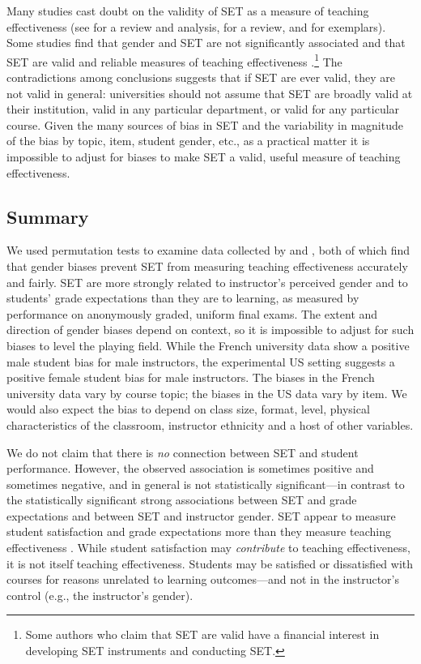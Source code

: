 \documentclass[12pt]{article}
\begin{document}
Many studies cast doubt on the validity of SET as a measure of teaching effectiveness 
(see \citet[Chapters 3--5]{johnson03} for a review and analysis, \citet{Pounder2007} for a review, 
and \citet{Galbraith2012,Carrell2010a} for exemplars). 
Some studies find that gender and SET are not significantly associated \citep{Bennett1982,Centra2000,Elmore1974} and that SET are valid and reliable measures of teaching effectiveness \citep{Benton2012,Centra1977}.\footnote{%
  Some authors who claim that SET are valid have a financial interest in 
  developing SET instruments and conducting SET.
} 
The contradictions among conclusions suggests that if SET are ever valid, they
are not valid in general: universities should not assume that SET are broadly valid at their
institution, valid in any particular department, or valid for any particular course. 
Given the many sources of bias in SET and the variability in magnitude of the bias
by topic, item, student gender, etc., as a practical matter it is impossible to adjust
for biases to make SET a valid, useful measure of teaching effectiveness. 

\subsection{Summary}
We used permutation tests to examine data collected  by
\citet{Boring2015} and \citet{MacNell2014}, both of which find that gender biases prevent 
SET from measuring teaching effectiveness accurately and fairly. 
SET are more strongly related to instructor's perceived gender and to students' 
grade expectations than they are to learning, 
as measured by performance on anonymously graded, uniform final exams. 
The extent and direction of gender biases depend on context, so it is
impossible to adjust for such biases to level the playing field.
While the French university data show a positive male student bias for male instructors, 
the experimental US setting suggests a positive female student bias for male instructors.
The biases in the French university data vary by course topic; the biases in the
US data vary by item.
We would also expect the bias to depend on class size, format, level, physical characteristics
of the classroom, instructor ethnicity and a host of other variables.

We do not claim that there is \emph{no} connection between SET and student
performance.
However, the observed association is sometimes positive and sometimes
negative, and in general is not statistically significant---in contrast to
the statistically significant strong associations between SET and grade expectations and 
between SET and instructor gender.
SET appear to measure student satisfaction and grade expectations more 
than they measure teaching 
effectiveness \citep{StarkFreishtat2014,johnson03}. 
While student satisfaction may \emph{contribute} to teaching effectiveness, it is not 
itself teaching effectiveness.
Students may be satisfied or dissatisfied with courses for reasons unrelated to 
learning outcomes---and not in the instructor's control (e.g., the instructor's gender).
\end{document}
